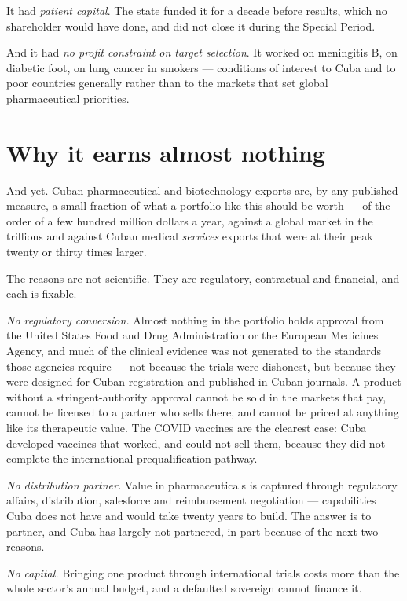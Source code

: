 It had \emph{patient capital}. The state funded it for a decade before results,
which no shareholder would have done, and did not close it during the Special
Period.

And it had \emph{no profit constraint on target selection}. It worked on
meningitis B, on diabetic foot, on lung cancer in smokers --- conditions of
interest to Cuba and to poor countries generally rather than to the markets that
set global pharmaceutical priorities.

\section{Why it earns almost nothing}

And yet. Cuban pharmaceutical and biotechnology exports are, by any published
measure, a small fraction of what a portfolio like this should be worth --- of
the order of a few hundred million dollars a year, against a global market in the
trillions and against Cuban medical \emph{services} exports that were at their
peak twenty or thirty times larger.\unv{}

The reasons are not scientific. They are regulatory, contractual and financial,
and each is fixable.

\emph{No regulatory conversion.} Almost nothing in the portfolio holds approval
from the United States Food and Drug Administration or the European Medicines
Agency, and much of the clinical evidence was not generated to the standards
those agencies require --- not because the trials were dishonest, but because
they were designed for Cuban registration and published in Cuban journals. A
product without a stringent-authority approval cannot be sold in the markets that
pay, cannot be licensed to a partner who sells there, and cannot be priced at
anything like its therapeutic value. The COVID vaccines are the clearest case:
Cuba developed vaccines that worked, and could not sell them, because they did
not complete the international prequalification pathway.

\emph{No distribution partner.} Value in pharmaceuticals is captured through
regulatory affairs, distribution, salesforce and reimbursement negotiation ---
capabilities Cuba does not have and would take twenty years to build. The answer
is to partner, and Cuba has largely not partnered, in part because of the next
two reasons.

\emph{No capital.} Bringing one product through international trials costs more
than the whole sector's annual budget, and a defaulted sovereign cannot finance
it.

